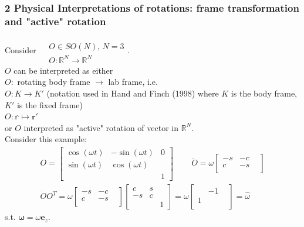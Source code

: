 \subsubsection{2 Physical Interpretations of rotations: frame transformation and "active" rotation}

Consider $\begin{aligned} & \quad \\ 
	& O\in SO(N), \, N =3 \\
	& O:\mathbb{R}^N \to \mathbb{R}^N \end{aligned}$. \\ 

$O$ can be interpreted as either \\
$O:$ rotating body frame $\to$ lab frame, i.e. \\
$O: K \to K'$ (notation used in Hand and Finch (1998) \cite{dgdt:HaFi1998} where $K$ is the body frame, $K'$ is the fixed frame) \\ 
$O:\mathbb{r} \mapsto \mathbf{r}'$ \\

or $O$ interpreted as "active" rotation of vector in $\mathbb{R}^N$. \\

Consider this example:
\begin{equation}
\begin{gathered}
O = \left[ \begin{matrix} \cos{(\omega t)} & - \sin{(\omega t)} & 0 \\
	\sin{(\omega t)} & \cos{(\omega t)} & \\
	& & 1 \end{matrix} \right] \quad \quad \, \dot{O} = \omega \left[ \begin{matrix} -s & -c & \\ 
	c & -s & \\
	& & \end{matrix} \right] \\
\dot{O} O^T = \omega \left[ \begin{matrix} -s & -c & \\ c & -s & \\ & & \end{matrix} \right] \left[ \begin{matrix} c & s & \\ -s & c & \\ & & 1 \end{matrix} \right] = \omega \left[ \begin{matrix} & -1 & \\ 1 & & \\ & & \end{matrix} \right] = \widehat{\omega} 
\end{gathered}
\end{equation}
s.t. $\mathbf{\omega} = \omega \mathbf{e}_z$.

